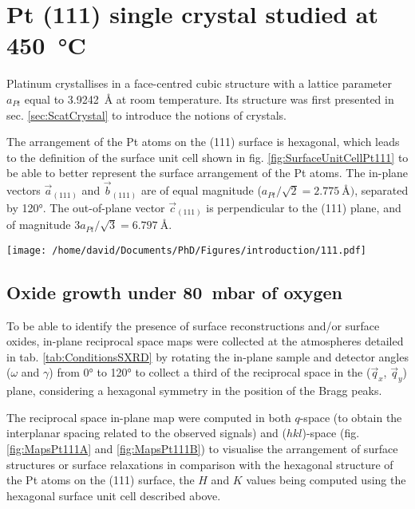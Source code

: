 \section{Pt (111) single crystal studied at \qty{450}{\degreeCelsius}} \label{sec:SXRD111}

Platinum crystallises in a face-centred cubic structure with a lattice parameter $a_{Pt}$ equal to \qty{3.9242}{\angstrom} at room temperature.
Its structure was first presented in sec. \ref{sec:ScatCrystal} to introduce the notions of crystals.

The arrangement of the Pt atoms on the (111) surface is hexagonal, which leads to the definition of the surface unit cell shown in fig. \ref{fig:SurfaceUnitCellPt111} to be able to better represent the surface arrangement of the Pt atoms.
The in-plane vectors $\vec{a}_{(111)}$ and $\vec{b}_{(111)}$ are of equal magnitude ($a_{Pt} / \sqrt{2} = \qty{2.775}{\angstrom})$, separated by \ang{120}.
The out-of-plane vector $\vec{c}_{(111)}$ is perpendicular to the (111) plane, and of magnitude $3 a_{Pt} / \sqrt{3} = \qty{6.797}{\angstrom}$.

\begin{SCfigure}
    \centering
    \texttt{[image: /home/david/Documents/PhD/Figures/introduction/111.pdf]}
    \caption{
        Face-centred cubic unit cell of Pt with (111) crystallographic plane drawn in green.
        $\vec{a}_{(111)}$, $\vec{b}_{(111)}$ and $\vec{c}_{(111)}$ are the $(111)$ surface unit cell vectors.
        There are three (111) planes spanned by the magnitude of $\vec{c}_{(111)}$ (blue, red and green on the figure).
    }
    \label{fig:SurfaceUnitCellPt111}
\end{SCfigure}

\subsection{Oxide growth under \qty{80}{\milli\bar} of oxygen}

To be able to identify the presence of surface reconstructions and/or surface oxides, in-plane reciprocal space maps were collected at the atmospheres detailed in tab. \ref{tab:ConditionsSXRD} by rotating the in-plane sample and detector angles ($\omega$ and $\gamma$) from \ang{0} to \ang{120} to collect a third of the reciprocal space in the ($\vec{q}_x$, $\vec{q}_y$) plane, considering a hexagonal symmetry in the position of the Bragg peaks.

The reciprocal space in-plane map were computed in both $q$-space (to obtain the interplanar spacing related to the observed signals) and ($hkl$)-space (fig. \ref{fig:MapsPt111A} and \ref{fig:MapsPt111B}) to visualise the arrangement of surface structures or surface relaxations in comparison with the hexagonal structure of the Pt atoms on the (111) surface, the $H$ and $K$ values being computed using the hexagonal surface unit cell described above.

